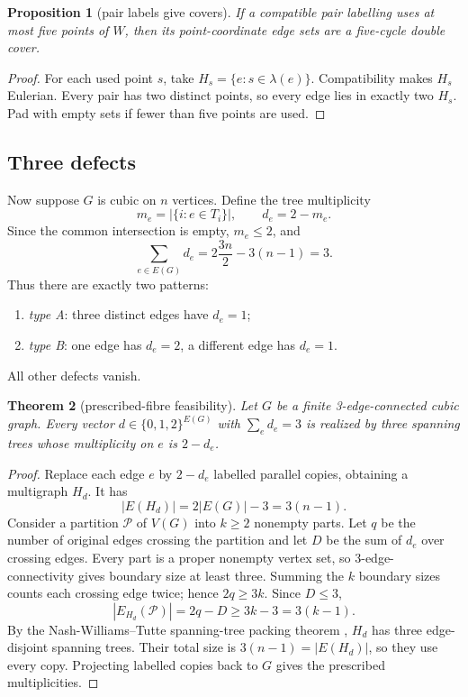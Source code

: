 \documentclass[11pt]{article}
\newtheorem{theorem}{Theorem}[section]
\newtheorem{proposition}[theorem]{Proposition}
\theoremstyle{definition}
\theoremstyle{remark}
\newcommand{\1}{\mathbf 1}
\begin{document}
\begin{proposition}[pair labels give covers]\label{prop:pairs-cover}
If a compatible pair labelling uses at most five points of \(W\), then
its point-coordinate edge sets are a five-cycle double cover.
\end{proposition}

\begin{proof}
For each used point \(s\), take \(H_s=\{e:s\in\lambda(e)\}\).
Compatibility makes \(H_s\) Eulerian.  Every pair has two distinct
points, so every edge lies in exactly two \(H_s\).  Pad with empty sets if
fewer than five points are used.
\end{proof}

\subsection{Three defects}

Now suppose \(G\) is cubic on \(n\) vertices.  Define the tree multiplicity
\[
 m_e=\bigl|\{i:e\in T_i\}\bigr|,\qquad d_e=2-m_e.         \tag{3.3}
\]
Since the common intersection is empty, \(m_e\leq2\), and
\[
 \sum_{e\in E(G)}d_e
 =2\frac{3n}{2}-3(n-1)=3.                                \tag{3.4}
\]
Thus there are exactly two patterns:
\begin{enumerate}
\item \emph{type A}: three distinct edges have \(d_e=1\);
\item \emph{type B}: one edge has \(d_e=2\), a different edge has
      \(d_e=1\).
\end{enumerate}
All other defects vanish.

\begin{theorem}[prescribed-fibre feasibility]\label{thm:feasible}
Let \(G\) be a finite 3-edge-connected cubic graph.  Every vector
\(d\in\{0,1,2\}^{E(G)}\) with \(\sum_e d_e=3\) is realized by three
spanning trees whose multiplicity on \(e\) is \(2-d_e\).
\end{theorem}

\begin{proof}
Replace each edge \(e\) by \(2-d_e\) labelled parallel copies, obtaining a
multigraph \(H_d\).  It has
\[
 |E(H_d)|=2|E(G)|-3=3(n-1).                              \tag{3.5}
\]
Consider a partition \(\mathcal P\) of \(V(G)\) into \(k\geq2\) nonempty
parts.  Let \(q\) be the number of original edges crossing the partition
and let \(D\) be the sum of \(d_e\) over crossing edges.  Every part is a
proper nonempty vertex set, so 3-edge-connectivity gives boundary size at
least three.  Summing the \(k\) boundary sizes counts each crossing edge
twice; hence \(2q\geq3k\).  Since \(D\leq3\),
\[
 |E_{H_d}(\mathcal P)|=2q-D\geq3k-3=3(k-1).              \tag{3.6}
\]
By the Nash-Williams--Tutte spanning-tree packing theorem
\cite{NashWilliams1961,Tutte1961}, \(H_d\) has three edge-disjoint
spanning trees.  Their total size is \(3(n-1)=|E(H_d)|\), so they use
every copy.  Projecting labelled copies back to \(G\) gives the prescribed
multiplicities.
\end{proof}
\end{document}
